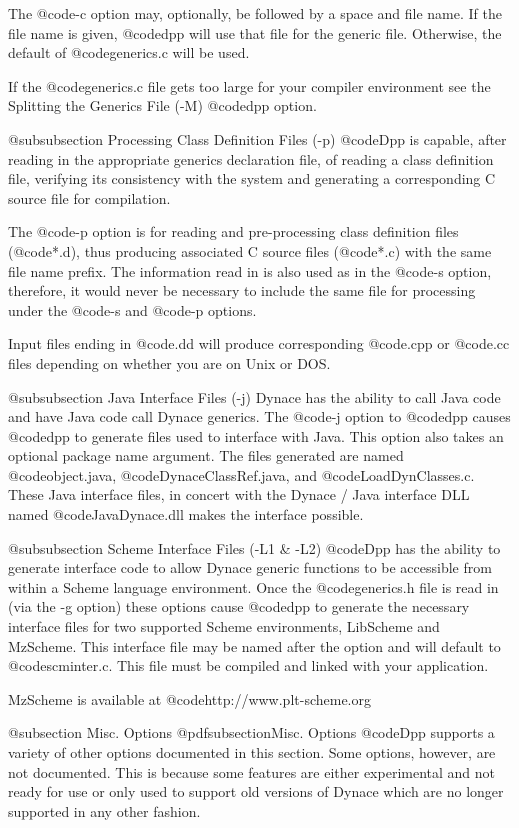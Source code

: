 The @code{-c} option may, optionally, be followed by a space and file
name.  If the file name is given, @code{dpp} will use that file for the
generic file.  Otherwise, the default of @code{generics.c} will be used.

If the @code{generics.c} file gets too large for your compiler environment
see the Splitting the Generics File (-M) @code{dpp} option.

@subsubsection Processing Class Definition Files (-p)
@code{Dpp} is capable, after reading in the appropriate generics
declaration file, of reading a class definition file, verifying
its consistency with the system and generating a corresponding
C source file for compilation.

The @code{-p} option is for reading and pre-processing class
definition files (@code{*.d}), thus producing associated
C source files (@code{*.c}) with the same file name prefix.
The information read in is also used as in the @code{-s} option,
therefore, it would never be necessary to include the same
file for processing under the @code{-s} and @code{-p} options.

Input files ending in @code{.dd} will produce corresponding
@code{.cpp} or @code{.cc} files depending on whether you are
on Unix or DOS.

@subsubsection Java Interface Files (-j)
Dynace has the ability to call Java code and have Java code
call Dynace generics.  The @code{-j} option to @code{dpp}
causes @code{dpp} to generate files used to interface with Java.
This option also takes an optional package name argument.
The files generated are named @code{object.java},
@code{DynaceClassRef.java}, and @code{LoadDynClasses.c}.
These Java interface files, in concert with the Dynace / Java interface DLL
named @code{JavaDynace.dll} makes the interface possible.

@subsubsection Scheme Interface Files (-L1 & -L2)
@code{Dpp} has the ability to generate interface code to allow Dynace
generic functions to be accessible from within a Scheme language
environment.  Once the @code{generics.h} file is read in (via the -g
option) these options cause @code{dpp} to generate the necessary
interface files for two supported Scheme environments, LibScheme and
MzScheme.  This interface file may be named after the option and
will default to @code{scminter.c}.  This file must be compiled and
linked with your application.

MzScheme is available at
@code{http://www.plt-scheme.org}

@subsection Misc. Options
@pdfsubsection{Misc. Options}
@code{Dpp} supports a variety of other options documented in this
section.  Some options, however, are not documented.  This is because
some features are either experimental and not ready for use or only used
to support old versions of Dynace which are no longer supported in any
other fashion.

